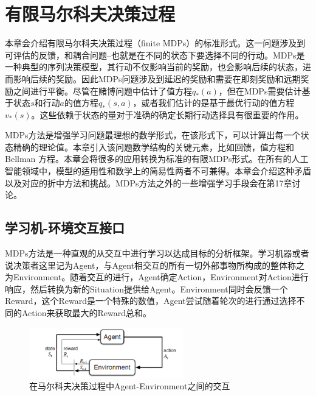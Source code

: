 \documentclass{ctexart}
\begin{document}
    \section{有限马尔科夫决策过程}
        本章会介绍有限马尔科夫决策过程（finite MDPs）的标准形式。这一问题涉及到可评估的反馈，和耦合问题--也就是在不同的状态下要选择不同的行动。MDPs是一种典型的序列决策模型，其行动不仅影响当前的奖励，也会影响后续的状态，进而影响后续的奖励。因此MDPs问题涉及到延迟的奖励和需要在即刻奖励和远期奖励之间进行平衡。尽管在赌博问题中估计了值方程$q_*(a)$，但在MDPs需要估计基于状态$s$和行动$a$的值方程$q_*(s,a)$，或者我们估计的是基于最优行动的值方程$v_*(s)$。这些依赖于状态的量对于准确的确定长期行动选择具有很重要的作用。

        MDPs方法是增强学习问题最理想的数学形式，在该形式下，可以计算出每一个状态精确的理论值。本章引入该问题数学结构的关键元素，比如回馈，值方程和Bellman 方程。本章会将很多的应用转换为标准的有限MDPs形式。在所有的人工智能领域中，模型的适用性和数学上的简易性两者不可兼得。本章会介绍这种矛盾以及对应的折中方法和挑战。MDPs方法之外的一些增强学习手段会在第17章讨论。

        \subsection{学习机-环境交互接口}
            MDPs方法是一种直观的从交互中进行学习以达成目标的分析框架。学习机器或者说决策者这里记为Agent，与Agent相交互的所有一切外部事物所构成的整体称之为Environment。随着交互的进行，Agent确定Action，Environment对Action进行响应，然后转换为新的Situation提供给Agent。Environment同时会反馈一个Reward，这个Reward是一个特殊的数值，Agent尝试随着轮次的进行通过选择不同的Action来获取最大的Reward总和。
            \begin{figure}
                \centering
                \includegraphics[width=0.6\textwidth]{f3-1}
                \caption{在马尔科夫决策过程中Agent-Environment之间的交互}
                \label{f3_1}
            \end{figure}
\end{document}
